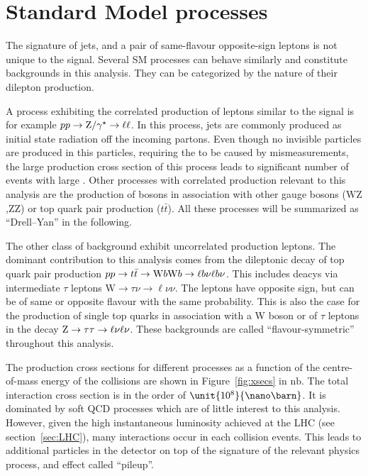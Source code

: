 \section{Standard Model processes}
\label{sec:SMBackgrounds}
The signature of jets, \MET and a pair of same-flavour opposite-sign leptons is not unique to the signal. Several SM processes can behave similarly and constitute backgrounds in this analysis. They can be categorized by the nature of their dilepton production. 

A process exhibiting the correlated production of leptons similar to the signal is for example $pp \rightarrow \mathrm{Z}/\gamma^{\star}\rightarrow \ell\ell$. In this process, jets are commonly produced as initial state radiation off the incoming partons. Even though no invisible particles are produced in this particles, requiring the \MET to be caused by mismeasurements, the large production cross section of this process leads to significant number of events with large \MET. Other processes with correlated production relevant to this analysis are the production of \Z bosons in association with other gauge bosons ($\mathrm{WZ}$,$\mathrm{ZZ}$) or top quark pair production ($t\bar{t}$\Z). All these processes will be summarized as ``Drell--Yan'' in the following. 

The other class of background exhibit uncorrelated production leptons. The dominant contribution to this analysis comes from the dileptonic decay of top quark pair production $pp\rightarrow t\bar{t} \rightarrow \mathrm{W} b \mathrm{W} b\rightarrow \ell b\nu \ell b \nu$. This includes deacys via intermediate $\tau$ leptons $\text{W}\rightarrow \tau \nu \rightarrow \ell \nu \nu$. The leptons have opposite sign, but can be of same or opposite flavour with the same probability. This is also the case for the production of single top quarks in association with a W boson or of $\tau$ leptons in the decay $\mathrm{Z} \rightarrow \tau\tau \rightarrow \ell\nu\ell\nu$. These backgrounds are called ``flavour-symmetric'' throughout this analysis.

The production cross sections for different processes as a function of the centre-of-mass energy of the collisions are shown in Figure~\ref{fig:xsecs} in $\mathrm{nb}$. The total interaction cross section is in the order of $\unit{10^{8}}{\nano\barn}$. It is dominated by soft QCD processes which are of little interest to this analysis. However, given the high instantaneous luminosity achieved at the LHC (see section~\ref{sec:LHC}), many interactions occur in each collision events. This leads to additional particles in the detector on top of the signature of the relevant physics process, and effect called ``pileup''.

